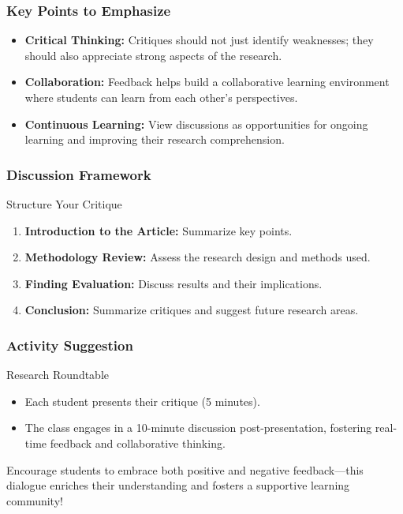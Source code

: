 \documentclass[aspectratio=169]{beamer}
\begin{document}
\begin{frame}[fragile]
    \frametitle{Key Points to Emphasize}
    \begin{itemize}
        \item \textbf{Critical Thinking:} Critiques should not just identify weaknesses; they should also appreciate strong aspects of the research.
        
        \item \textbf{Collaboration:} Feedback helps build a collaborative learning environment where students can learn from each other’s perspectives.
        
        \item \textbf{Continuous Learning:} View discussions as opportunities for ongoing learning and improving their research comprehension.
    \end{itemize}
\end{frame}

\begin{frame}[fragile]
    \frametitle{Discussion Framework}
    \begin{block}{Structure Your Critique}
        \begin{enumerate}
            \item \textbf{Introduction to the Article:} Summarize key points.
            \item \textbf{Methodology Review:} Assess the research design and methods used.
            \item \textbf{Finding Evaluation:} Discuss results and their implications.
            \item \textbf{Conclusion:} Summarize critiques and suggest future research areas.
        \end{enumerate}
    \end{block}
\end{frame}

\begin{frame}[fragile]
    \frametitle{Activity Suggestion}
    \begin{block}{Research Roundtable}
        \begin{itemize}
            \item Each student presents their critique (5 minutes).
            \item The class engages in a 10-minute discussion post-presentation, fostering real-time feedback and collaborative thinking.
        \end{itemize}
    \end{block}
    Encourage students to embrace both positive and negative feedback—this dialogue enriches their understanding and fosters a supportive learning community!
\end{frame}
\end{document}
